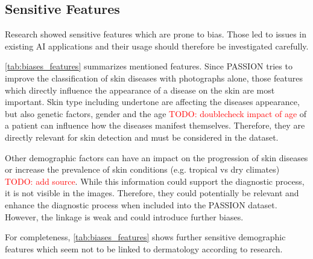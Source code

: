 \documentclass[12pt, a4paper, oneside]{book}   	%
\renewcommand{\todo}[1]{\textcolor{red}{TODO: #1}}
\begin{document}
			
			\subsection{Sensitive Features}
			Research showed sensitive features which are prone to bias. Those led to issues in existing AI applications and their usage should therefore be investigated carefully.
			
			\ref{tab:biases_features} summarizes mentioned features. Since PASSION tries to improve the classification of skin diseases with photographs alone, those features which directly influence the appearance of a disease on the skin are most important. Skin type including undertone are affecting the diseases appearance, but also genetic factors, gender and the age \todo{doublecheck impact of age} of a patient can influence how the diseases manifest themselves. Therefore, they are directly relevant for skin detection and must be considered in the dataset.
			
			Other demographic factors can have an impact on the progression of skin diseases or increase the prevalence of skin conditions (e.g. tropical vs dry climates) \todo{add source}. While this information could support the diagnostic process, it is not visible in the images. Therefore, they could potentially be relevant and enhance the diagnostic process when included into the PASSION dataset. However, the linkage is weak and could introduce further biases.
			
			For completeness, \ref{tab:biases_features} shows further sensitive demographic features which seem not to be linked to dermatology according to research.
			
\end{document}
